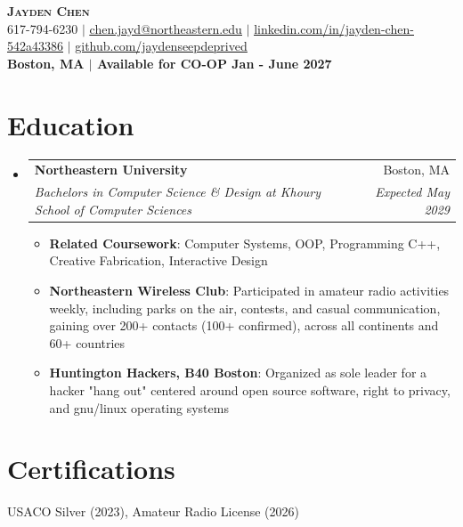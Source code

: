 \documentclass[letterpaper,11pt]{article}
\makeatletter
\newcommand{\resumeItem}[1]{
  \item\small{
    {#1 \vspace{-2pt}}
  }
}
\newcommand{\resumeSubheading}[4]{
  \vspace{-2pt}\item
    \begin{tabular*}{0.97\textwidth}[t]{l@{\extracolsep{\fill}}r}
      \textbf{#1} & #2 \\
      \textit{\small#3} & \textit{\small #4} \\
    \end{tabular*}\vspace{-7pt}
}
\newcommand{\resumeSubHeadingListStart}{\begin{itemize}[leftmargin=0.15in, label={}]}
\newcommand{\resumeSubHeadingListEnd}{\end{itemize}}
\newcommand{\resumeItemListStart}{\begin{itemize}}
\newcommand{\resumeItemListEnd}{\end{itemize}\vspace{-5pt}}
\makeatother
\begin{document}

\begin{center}
    \textbf{\Huge \scshape Jayden Chen} \\ \vspace{1pt}
	\small 617-794-6230 $|$ \href{chen.jayd@northeastern.edu}{\underline{chen.jayd@northeastern.edu}} $|$ 
    \href{https://linkedin.com/in/jayden-chen-542a43386/}{\underline{linkedin.com/in/jayden-chen-542a43386}} $|$
    \href{https://github.com/jaydenseepdeprived}{\underline{github.com/jaydenseepdeprived}}
	\\ \vspace{5pt}
	\small \textbf{{Boston, MA} $|$ {Available for CO-OP Jan - June 2027}}
\end{center}



\section{Education}
  \resumeSubHeadingListStart
    \resumeSubheading
      {Northeastern University}{Boston, MA}
      {Bachelors in Computer Science \& Design at Khoury School of Computer Sciences}{Expected May 2029}
      \resumeItemListStart
	\resumeItem{\textbf{Related Coursework}: Computer Systems, OOP, Programming C++, Creative Fabrication, Interactive Design}
	\resumeItem{\textbf{Northeastern Wireless Club}: Participated in amateur radio activities weekly, including parks on the air, contests, and casual communication, gaining over 200+ contacts (100+ confirmed), across all continents and 60+ countries}
	\resumeItem{\textbf{Huntington Hackers, B40 Boston}: Organized as sole leader for a hacker "hang out" centered around open source software, right to privacy, and gnu/linux operating systems}
	\resumeItemListEnd
  \resumeSubHeadingListEnd

\section{Certifications}
  \begin{itemize}[leftmargin=0.15in, label={}]
    \small{\item{
				{USACO Silver (2023)}{, Amateur Radio License (2026)} \\
    }}
  \end{itemize}
\end{document}
